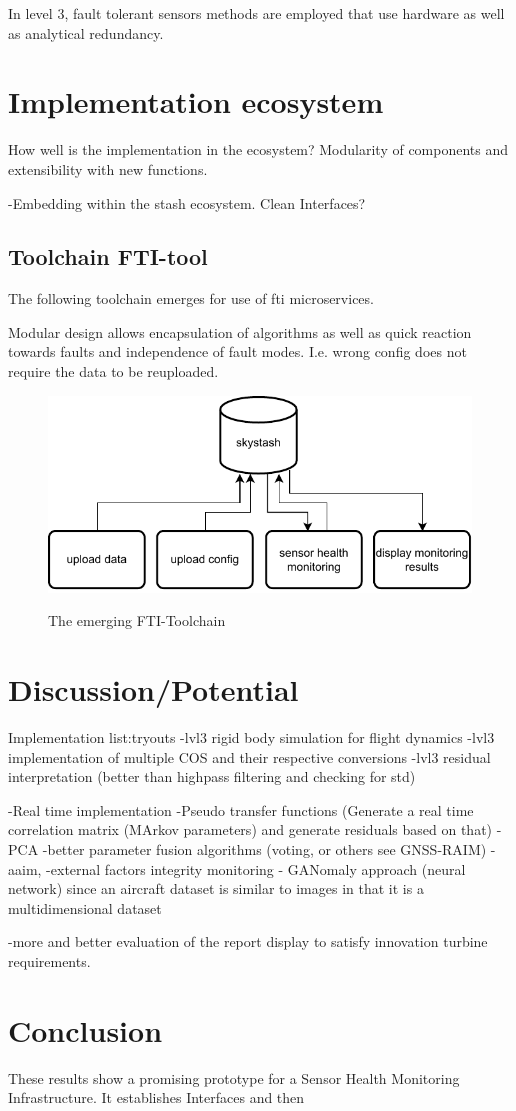 In level 3, fault tolerant sensors methods are employed that use hardware as well as analytical redundancy. \cite[p.355-365]{isermann_fault-diagnosis_2006}





\section{Implementation ecosystem}

How well is the implementation in the ecosystem? Modularity of components and extensibility with new functions.


-Embedding within the stash ecosystem. Clean Interfaces?



\subsection{Toolchain FTI-tool}
The following toolchain emerges for use of fti microservices.

Modular design allows encapsulation of algorithms as well as quick reaction towards faults and independence of fault modes.
I.e. wrong config does not require the data to be reuploaded.


\begin{figure}
    \centering
    \includegraphics[width=.7\textwidth]{03_figures/FTI_microservices}
    \label{fig:fti-micro}
    \caption{The emerging FTI-Toolchain}
\end{figure}


\section{Discussion/Potential}

Implementation list:tryouts
-lvl3 rigid body simulation for flight dynamics
-lvl3 implementation of multiple COS and their respective conversions
-lvl3 residual interpretation (better than highpass filtering and checking for std)

-Real time implementation
-Pseudo transfer functions (Generate a real time correlation matrix (MArkov parameters) and generate residuals based on that)
-PCA
-better parameter fusion algorithms (voting, or others see GNSS-RAIM)
        -aaim,
        -external factors integrity monitoring
- GANomaly approach (neural network) since an aircraft dataset is similar to images in that it is a multidimensional dataset

-more and better evaluation of the report display to satisfy innovation turbine requirements.


\section{Conclusion}

These results show a promising prototype for a Sensor Health Monitoring Infrastructure. It establishes Interfaces and then
